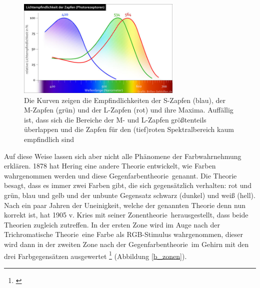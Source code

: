 \begin{figure}[H]     %
\centering
\includegraphics[width=0.7\textwidth]{bilder/sml} 
\caption {Die Kurven zeigen die Empfindlichkeiten der S-Zapfen (blau), der M-Zapfen (grün) und der L-Zapfen (rot) und ihre Maxima. Auffällig ist, dass sich die Bereiche der M- und L-Zapfen größtenteils überlappen und die Zapfen für den (tief)roten Spektralbereich kaum empfindlich sind\protect\footnotemark}\label{b_sml}
\end{figure}


Auf diese Weise lassen sich aber nicht alle Phänomene der Farbwahrnehmung erklären. 1878 hat Hering eine andere Theorie entwickelt, wie Farben wahrgenommen werden und diese \glqq Gegenfarbentheorie\grqq\ genannt. Die Theorie besagt, dass es immer zwei Farben gibt, die sich gegensätzlich verhalten: rot und grün, blau und gelb und der unbunte Gegensatz schwarz (dunkel) und weiß (hell).\\ Nach ein paar Jahren der Uneinigkeit, welche der genannten Theorie denn nun korrekt ist, hat 1905 v. Kries mit seiner \glqq Zonentheorie\grqq\ herausgestellt, dass beide Theorien zugleich zutreffen. In der ersten Zone wird im Auge nach der \glqq Trichromatische Theorie\grqq\ eine Farbe als RGB-Stimulus wahrgenommen, dieser wird dann in der zweiten Zone nach der \glqq Gegenfarbentheorie\grqq\ im Gehirn mit den drei Farbgegensätzen ausgewertet \footnote{\cite[104]{hentschel}} (Abbildung \ref{b_zonen}).
 
